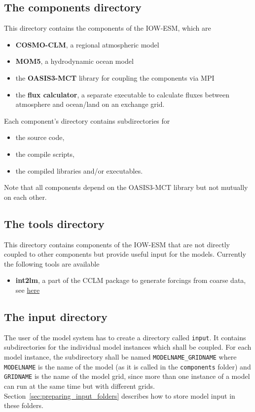 \documentclass[a4paper,titlepage]{scrartcl}
\begin{document}
\subsection{The components directory}
This directory contains the components of the IOW-ESM, which are
\begin{itemize}
\item \textbf{COSMO-CLM}, a regional atmospheric model
\item \textbf{MOM5}, a hydrodynamic ocean model
\item the \textbf{OASIS3-MCT} library for coupling the components via MPI
\item the \textbf{flux calculator}, a separate executable to calculate fluxes between atmosphere and ocean/land on an exchange grid.
\end{itemize}

Each component's directory contains subdirectories for
\begin{itemize}
\item the source code,
\item the compile scripts,
\item the compiled libraries and/or executables.
\end{itemize}

Note that all components depend on the OASIS3-MCT library but not mutually on each other.

\subsection{The tools directory}
This directory contains components of the IOW-ESM that are not directly coupled to other components but provide useful input for the models.
Currently the following tools are available
\begin{itemize}
\item \textbf{int2lm}, a part of the CCLM package to generate forcings from coarse data, see \href{https://wiki.coast.hereon.de/clmcom/}{here}
\end{itemize}
 

\subsection{The input directory}
The user of the model system has to create a directory called \texttt{input}.
It contains subdirectories for the individual model instances which shall be coupled.
For each model instance, the subdirectory shall be named \texttt{\color{red}MODELNAME\color{black}\_\color{red}GRIDNAME} where \texttt{\color{red}MODELNAME} is the name of the model (as it is called in the \texttt{components} folder) and \texttt{\color{red}GRIDNAME} is the name of the model grid, since more than one instance of a model can run at the same time but with different grids.
Section~\ref{sec:preparing_input_folders} describes how to store model input in these folders.
\end{document}

